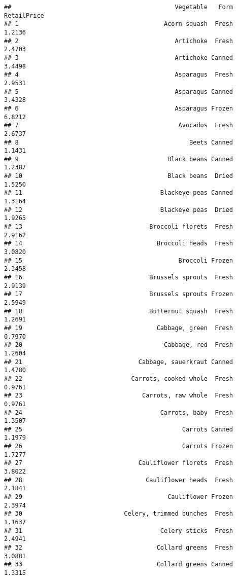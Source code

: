 \documentclass[
]{article}
\begin{document}
\begin{verbatim}
##                                             Vegetable   Form RetailPrice
## 1                                        Acorn squash  Fresh      1.2136
## 2                                           Artichoke  Fresh      2.4703
## 3                                           Artichoke Canned      3.4498
## 4                                           Asparagus  Fresh      2.9531
## 5                                           Asparagus Canned      3.4328
## 6                                           Asparagus Frozen      6.8212
## 7                                            Avocados  Fresh      2.6737
## 8                                               Beets Canned      1.1431
## 9                                         Black beans Canned      1.2387
## 10                                        Black beans  Dried      1.5250
## 11                                      Blackeye peas Canned      1.3164
## 12                                      Blackeye peas  Dried      1.9265
## 13                                   Broccoli florets  Fresh      2.9162
## 14                                     Broccoli heads  Fresh      3.0820
## 15                                           Broccoli Frozen      2.3458
## 16                                   Brussels sprouts  Fresh      2.9139
## 17                                   Brussels sprouts Frozen      2.5949
## 18                                   Butternut squash  Fresh      1.2691
## 19                                     Cabbage, green  Fresh      0.7970
## 20                                       Cabbage, red  Fresh      1.2604
## 21                                Cabbage, sauerkraut Canned      1.4780
## 22                              Carrots, cooked whole  Fresh      0.9761
## 23                                 Carrots, raw whole  Fresh      0.9761
## 24                                      Carrots, baby  Fresh      1.3507
## 25                                            Carrots Canned      1.1979
## 26                                            Carrots Frozen      1.7277
## 27                                Cauliflower florets  Fresh      3.8022
## 28                                  Cauliflower heads  Fresh      2.1841
## 29                                        Cauliflower Frozen      2.3974
## 30                            Celery, trimmed bunches  Fresh      1.1637
## 31                                      Celery sticks  Fresh      2.4941
## 32                                     Collard greens  Fresh      3.0881
## 33                                     Collard greens Canned      1.3315

\end{verbatim}
\end{document}
